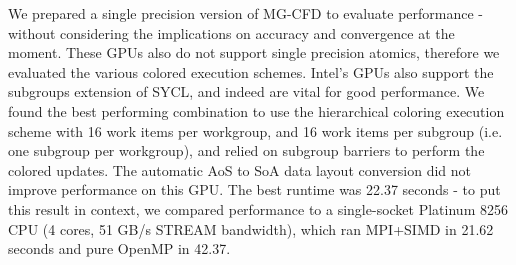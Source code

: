\documentclass[runningheads]{llncs}
\begin{document}
We prepared a single precision version of MG-CFD to evaluate performance - 
without considering the implications on accuracy and convergence at the moment. 
These GPUs also do not support single precision atomics, therefore we evaluated 
the various colored execution schemes. Intel's GPUs also support the subgroups 
extension of SYCL, and indeed are vital for good performance. We found the best 
performing combination to use the hierarchical coloring execution scheme with 16 
work items per workgroup, and 16 work items per subgroup (i.e. one subgroup per 
workgroup), and relied on subgroup barriers to perform the colored updates. The 
automatic AoS to SoA data layout conversion did not improve performance on this 
GPU. The best runtime was 22.37 seconds - to put this result in context, we 
compared performance to a single-socket Platinum 8256 CPU (4 cores, 51 GB/s 
STREAM bandwidth), which ran MPI+SIMD in 21.62 seconds and pure OpenMP in 42.37.


\end{document}
